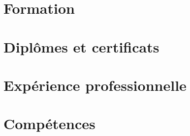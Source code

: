 




\begin{sloppypar}
\begin{paracol}{2}





\section{Formation}




\section{Dipl\^omes et certificats}




\section{Exp\'erience professionnelle}




\section{Comp\'etences}




\switchcolumn



\end{paracol}
\end{sloppypar}
